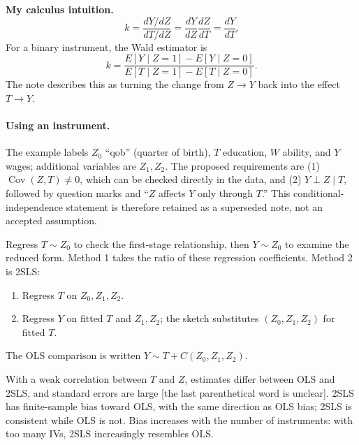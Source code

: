 {\textbf{My calculus intuition.}
\[k=\frac{dY/dZ}{dT/dZ}=\frac{dY}{dZ}\frac{dZ}{dT}=\frac{dY}{dT}.\]
For a binary instrument, the Wald estimator is
\[k=\frac{E[Y\mid Z=1]-E[Y\mid Z=0]}{E[T\mid Z=1]-E[T\mid Z=0]}.\]
The note describes this as turning the change from $Z\to Y$ back into the effect $T\to Y$.

\paragraph{Using an instrument.}
The example labels $Z_0$ ``qob'' (quarter of birth), $T$ education, $W$ ability, and $Y$ wages; additional variables are $Z_1,Z_2$. The proposed requirements are (1) $\operatorname{Cov}(Z,T)\ne0$, which can be checked directly in the data, and (2) $Y\perp Z\mid T$, followed by question marks and ``$Z$ affects $Y$ only through $T$.''  This conditional-independence statement is therefore retained as a superseded note, not an accepted assumption.

Regress $T\sim Z_0$ to check the first-stage relationship, then $Y\sim Z_0$ to examine the reduced form. Method 1 takes the ratio of these regression coefficients. Method 2 is 2SLS:
\begin{enumerate}
\item Regress $T$ on $Z_0,Z_1,Z_2$.
\item Regress $Y$ on fitted $T$ and $Z_1,Z_2$; the sketch substitutes $(Z_0,Z_1,Z_2)$ for fitted $T$.
\end{enumerate}
 The OLS comparison is written $Y\sim T+C(Z_0,Z_1,Z_2)$.

With a weak correlation between $T$ and $Z$, estimates differ between OLS and 2SLS, and standard errors are large [the last parenthetical word is unclear]. 2SLS has finite-sample bias toward OLS, with the same direction as OLS bias; 2SLS is consistent while OLS is not. Bias increases with the number of instruments: with too many IVs, 2SLS increasingly resembles OLS.

\begin{center}
\end{center}}
